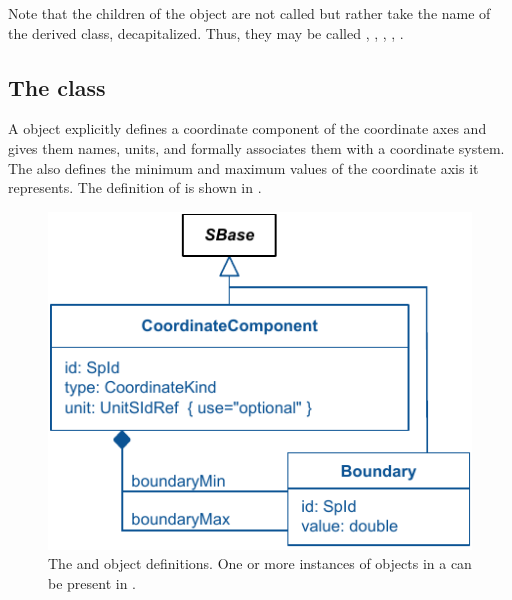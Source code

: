 Note that the children of the \ListOfGeometryDefinitions object are not called  but rather take the name of the derived class, decapitalized.  Thus, they may be called , , , , .



\subsection{The  class}
\label{coordinatecomponent-class}
A \CoordinateComponent object explicitly defines a coordinate component of the coordinate axes and gives them names, units, and formally associates them with a coordinate system. The \CoordinateComponent also defines the minimum and maximum values of the coordinate axis it represents. The definition of \CoordinateComponent is shown in .
 
\begin{figure}[ht]
  \includegraphics{figs/CoordinateComponent-uml}
  \caption{The \CoordinateComponent and \Boundary object definitions. One or more instances of \CoordinateComponent objects in a \ListOfCoordinateComponents can be present in \Geometry.}
  \label{CoordinateComponent-uml}
\end{figure}


